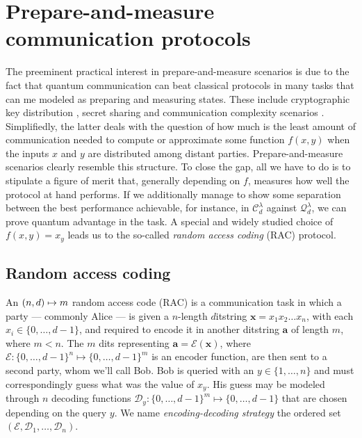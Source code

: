     \section{Prepare-and-measure communication protocols}
    \label{sec:communication-protocols}

        The preeminent practical interest in prepare-and-measure scenarios is due to the fact that quantum communication can beat classical protocols in many tasks that can me modeled as preparing and measuring states. These include cryptographic key distribution \cite{pawlowski_pamqkd_2011}, secret sharing \cite{schmid_secret_2005} and communication complexity scenarios \cite{buhrman_communicationreview_2010}. Simplifiedly, the latter deals with the question of how much is the least amount of communication needed to compute or approximate some function $f(x,y)$ when the inputs $x$ and $y$ are distributed among distant parties. Prepare-and-measure scenarios clearly resemble this structure. To close the gap, all we have to do is to stipulate a figure of merit that, generally depending on $f$, measures how well the protocol at hand performs. If we additionally manage to show some separation between the best performance achievable, for instance, in $\mathcal{C}_d^\lambda$ against $\mathcal{Q}_d^\lambda$, we can prove quantum advantage in the task. A special and widely studied choice of $f(x,y) = x_y$ leads us to the so-called \emph{random access coding} (RAC) protocol.

        \subsection{Random access coding}
        \label{sec:racs}

            An $\left( n, d \right) \mapsto m$ random access code (RAC) is a communication task in which a party --- commonly Alice --- is given a $n$-length $d$itstring $\mathbf{x} = x_1 x_2 \ldots x_n$, with each $x_i \in \{0, \ldots, d - 1 \}$, and required to encode it in another ditstring $\mathbf{a}$ of length $m$, where $m < n$. The $m$ dits representing $\mathbf{a} = \mathcal{E}(\mathbf{x})$, where $\mathcal{E} : \{0, \ldots, d - 1\}^n \mapsto \{0, \ldots, d - 1\}^m$ is an encoder function, are then sent to a second party, whom we'll call Bob. Bob is queried with an $y \in \{1, \ldots, n\}$ and must correspondingly guess what was the value of $x_y$. His guess may be modeled through $n$ decoding functions $\mathcal{D}_y : \{0, \ldots, d - 1\}^m \mapsto \{0, \ldots, d - 1\}$ that are chosen depending on the query $y$. We name \textit{encoding-decoding strategy} the ordered set $(\mathcal{E}, \mathcal{D}_{1},\ldots,\mathcal{D}_{n})$. 

